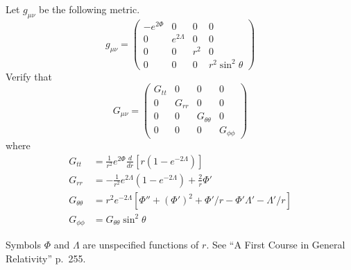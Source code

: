 \documentclass[12pt]{article}
\begin{document}
\noindent
Let $g_{\mu\nu}$ be the following metric.
$$
g_{\mu\nu}=
\begin{pmatrix}
-e^{2\Phi} & 0 & 0 & 0\\
0 & e^{2\Lambda} & 0 & 0\\
0 & 0 & r^2 & 0\\
0 & 0 & 0 & r^2\sin^2\theta
\end{pmatrix}
$$
Verify that
$$
G_{\mu\nu}=\begin{pmatrix}
G_{tt} & 0 & 0 & 0\\
0 & G_{rr} & 0 & 0\\
0 & 0 & G_{\theta\theta} & 0\\
0 & 0 & 0 & G_{\phi\phi}
\end{pmatrix}
$$
where
\begin{align*}
G_{tt}&=\frac{1}{r^2}e^{2\Phi}\frac{d}{dr}[r(1-e^{-2\Lambda})]
\\[2ex]
G_{rr}&=-\frac{1}{r^2}e^{2\Lambda}(1-e^{-2\Lambda})+\frac{2}{r}\Phi'
\\[2ex]
G_{\theta\theta}&=r^2e^{-2\Lambda}\left[\Phi''+(\Phi')^2+\Phi'/r-\Phi'\Lambda'-\Lambda'/r\right]
\\[2ex]
G_{\phi\phi}&=G_{\theta\theta}\sin^2\theta
\end{align*}

\noindent
Symbols $\Phi$ and $\Lambda$ are unspecified functions of $r$.
See ``A First Course in General Relativity'' p.~255.
\end{document}
